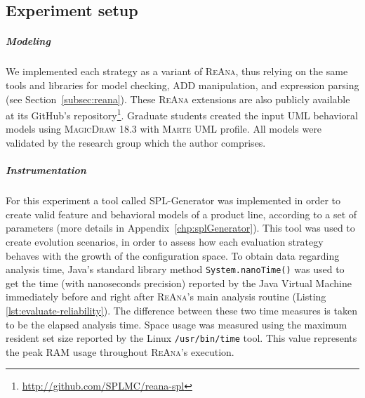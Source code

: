 \subsection{Experiment setup \label{sec:experimentSetup}}


\subparagraph*{Modeling} We implemented each strategy as a variant of
\textsc{ReAna}, thus relying on the same tools and libraries for model checking,
ADD manipulation, and expression parsing (see Section~\ref{subsec:reana}). These
\textsc{ReAna} extensions are also publicly available at its GitHub's
repository\footnote{\url{http://github.com/SPLMC/reana-spl}}. Graduate
students created the input UML behavioral models using \textsc{MagicDraw} 18.3
with \textsc{Marte UML} profile. All models were validated by the research group
which the author comprises.

\subparagraph*{Instrumentation}  For this experiment a tool called SPL-Generator
was implemented in order to create valid feature and behavioral models of a
product line, according to a set of parameters (more details in
Appendix~\ref{chp:splGenerator}).  This tool was used to create evolution scenarios, in
order to assess how each evaluation strategy behaves with the growth of the
configuration space.  To obtain data regarding analysis time, Java's standard
library method \texttt{System.nanoTime()} was used to get the time (with
nanoseconds precision) reported by the Java Virtual Machine immediately before
and right after \textsc{ReAna}'s main analysis routine (Listing
\ref{lst:evaluate-reliability}).  The difference between these two time measures
is taken to be the elapsed analysis time.  Space usage was measured using the
maximum resident set size reported by the Linux \texttt{/usr/bin/time} tool.
This value represents the peak RAM usage throughout \textsc{ReAna}'s execution.


